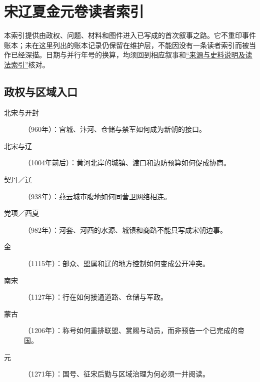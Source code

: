 \chapter{宋辽夏金元卷读者索引}
\label{app:index}

本索引提供由政权、问题、材料和图件进入已写成的首次叙事之路。它不重印事件账本；未在这里列出的账本记录仍保留在维护层，不能因没有一条读者索引而被当作已经深描。日期与并行年号的换算，均须回到相应叙事和\hyperref[app:sources]{“来源与史料说明及读法索引”}核对。

\section{政权与区域入口}
\begin{description}
  \item[北宋与开封] （960年）：宫城、汴河、仓储与禁军如何成为新朝的接口。
  \item[北宋与辽] （1004年前后）：黄河北岸的城镇、渡口和边防预算如何促成协商。
  \item[契丹／辽] （938年）：燕云城市腹地如何同营卫网络相连。
  \item[党项／西夏] （982年）：河套、河西的水源、城镇和商路不能只写成宋朝边事。
  \item[金] （1115年）：部众、盟属和辽的地方控制如何变成公开冲突。
  \item[南宋] （1127年）：行在如何接通道路、仓储与军政。
  \item[蒙古] （1206年）：称号如何重排联盟、赏赐与动员，而非预告一个已完成的帝国。
  \item[元] （1271年）：国号、征宋后勤与区域治理为何必须一并阅读。
\end{description}

